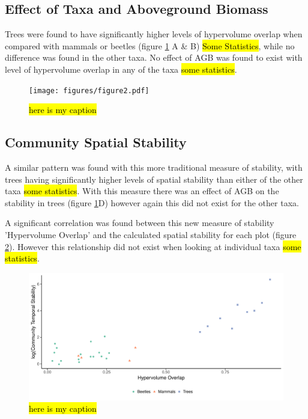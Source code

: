 \subsection{Effect of Taxa and Aboveground Biomass}

Trees were found to have significantly higher levels of hypervolume overlap when compared with mammals or beetles (figure \ref{fig:2} A \& B) \hl{Some Statistics}, while no difference was found in the other taxa. No effect of AGB was found to exist with level of hypervolume overlap in any of the taxa \hl{some statistics}.

\begin{figure}[H]
	\centering
	\texttt{[image: figures/figure2.pdf]}
	\caption{\hl{here is my caption}}
	\label{fig:2}
\end{figure}


\subsection{Community Spatial Stability}

A similar pattern was found with this more traditional measure of stability, with trees having significantly higher levels of spatial stability than either of the other taxa \hl{some statistics}. With this measure there was an effect of AGB on the stability in trees (figure \ref{fig:2}D) however again this did not exist for the other taxa.


A significant correlation was found between this new measure of stability 'Hypervolume Overlap' and the calculated spatial stability for each plot (figure \ref{fig:3}). However this relationship did not exist when looking at individual taxa \hl{some statistics}.

\begin{figure}[H]
	\centering
	\includegraphics[width=\textwidth]{figures/figure3.pdf}
	\caption{\hl{here is my caption}}
	\label{fig:3}
\end{figure}
